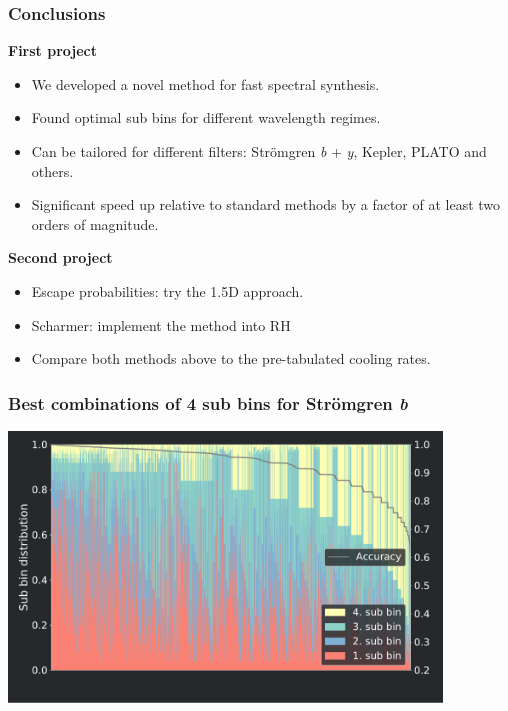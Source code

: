 \frame
{
	\frametitle{Conclusions}
	\large{
	\textbf{First project}
	\begin{itemize}
		\item We developed a novel method for fast spectral synthesis. \\%
		\item Found optimal sub bins for different wavelength regimes.\\%
	    \item Can be tailored for different filters: Strömgren \textit{b} + \textit{y}, Kepler, PLATO  and others.\\%
	    \item Significant speed up relative to standard  methods by a factor of at least two orders of magnitude.\\[12pt]
	\end{itemize}
	
	\textbf{Second project}
	\begin{itemize}
		\item Escape probabilities: try the 1.5D approach. 
		\item Scharmer: implement the method into RH 
		\item Compare both methods above to the pre-tabulated cooling rates.\\%
	\end{itemize}
	
	}
}

\backupbegin




\frame
{
	\frametitle{Best combinations of 4 sub bins for Str\"omgren \textit{b}}
	\centering
	\includegraphics[width=115mm]{images/optimal_stroemgren_0_c_b}
}

